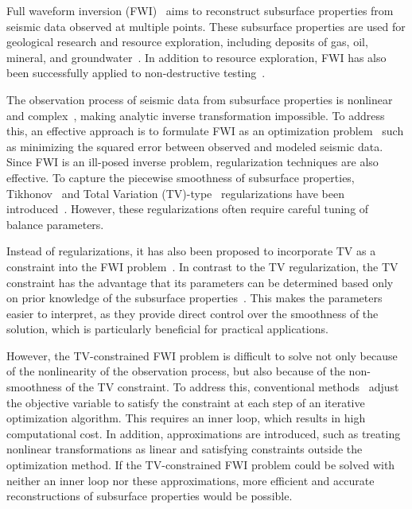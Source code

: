 Full waveform inversion (FWI)~\cite{FWI0,FWI1} aims to reconstruct subsurface properties from seismic data observed at multiple points.
These subsurface properties are used for geological research and resource exploration, including deposits of gas, oil, mineral, and groundwater~\cite{FWI1,FWIApplicationGroundwater0,FWIApplicationGroundwater1}.
In addition to resource exploration, FWI has also been successfully applied to non-destructive testing~\cite{FWIApplicationNonDestructiveTesting0,FWIApplicationNonDestructiveTesting1}.

The observation process of seismic data from subsurface properties is nonlinear and complex~\cite{FWI1}, making analytic inverse transformation impossible.
To address this, an effective approach is to formulate FWI as an optimization problem~\cite{FWI0,CustomFWI0,CustomFWI1,CustomFWI2,CustomFWI3,CustomFWI4,CustomFWI5} such as minimizing the squared error between observed and modeled seismic data.
Since FWI is an ill-posed inverse problem, regularization techniques are also effective.
To capture the piecewise smoothness of subsurface properties, Tikhonov~\cite{tikhonov} and Total Variation (TV)-type~\cite{TV,TGV} regularizations have been introduced~\cite{FWI-with-tikhonov-regularization,FWI-with-TV-regularization,FWI-with-directional-TV-regularization,FWI-with-high-order-TV-regularization,FWI-with-TGV-regularization}.
However, these regularizations often require careful tuning of balance parameters.

Instead of regularizations, it has also been proposed to incorporate TV as a constraint into the FWI problem~\cite{FWI-with-TV-constraint,FWI-with-TV-constraint2,FWI-with-TV-constraint3}.
In contrast to the TV regularization, the TV constraint has the advantage that its parameters can be determined based only on prior knowledge of the subsurface properties~\cite{constraints-vs-penalties-in-FWI}.
This makes the parameters easier to interpret, as they provide direct control over the smoothness of the solution, which is particularly beneficial for practical applications.

However, the TV-constrained FWI problem is difficult to solve not only because of the nonlinearity of the observation process, but also because of the non-smoothness of the TV constraint.
To address this, conventional methods~\cite{FWI-with-TV-constraint,FWI-with-TV-constraint2,FWI-with-TV-constraint3} adjust the objective variable to satisfy the constraint at each step of an iterative optimization algorithm.
This requires an inner loop, which results in high computational cost.
In addition, approximations are introduced, such as treating nonlinear transformations as linear and satisfying constraints outside the optimization method.
If the TV-constrained FWI problem could be solved with neither an inner loop nor these approximations, more efficient and accurate reconstructions of subsurface properties would be possible.

